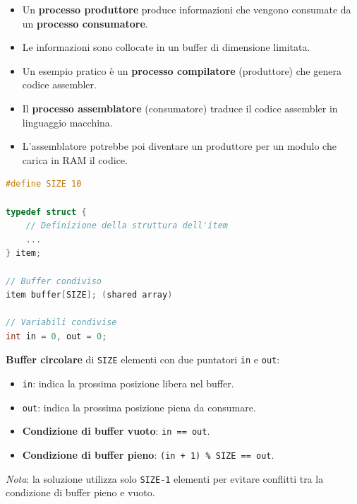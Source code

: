 \begin{itemize}
    \item Un \textbf{processo produttore} produce informazioni che vengono consumate da un \textbf{processo consumatore}.
    \item Le informazioni sono collocate in un buffer di dimensione limitata.
    \item Un esempio pratico è un \textbf{processo compilatore} (produttore) che genera codice assembler.
    \item Il \textbf{processo assemblatore} (consumatore) traduce il codice assembler in linguaggio macchina.
    \item L'assemblatore potrebbe poi diventare un produttore per un modulo che carica in RAM il codice.
\end{itemize}

\begin{lstlisting}[language=C]
#define SIZE 10

typedef struct {
    // Definizione della struttura dell'item
    ...
} item;

// Buffer condiviso
item buffer[SIZE]; (shared array)

// Variabili condivise
int in = 0, out = 0; 
\end{lstlisting}

\textbf{Buffer circolare} di \texttt{SIZE} elementi con due puntatori \texttt{in} e \texttt{out}:
\begin{itemize}
    \item \texttt{in}: indica la prossima posizione libera nel buffer.
    \item \texttt{out}: indica la prossima posizione piena da consumare.
    \item \textbf{Condizione di buffer vuoto}: \texttt{in == out}.
    \item \textbf{Condizione di buffer pieno}: \texttt{(in + 1) \% SIZE == out}.
\end{itemize}

\textit{Nota}: la soluzione utilizza solo \texttt{SIZE-1} elementi per evitare conflitti tra la condizione di buffer pieno e vuoto.

